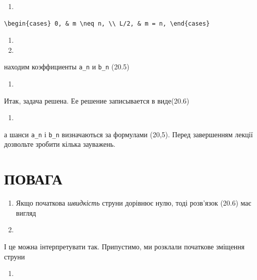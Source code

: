 \documentclass[
  ukrainian,
]{article}
\providecommand{\tightlist}{%
  \setlength{\itemsep}{0pt}\setlength{\parskip}{0pt}}
\begin{document}
\begin{enumerate}
\def\labelenumi{\arabic{enumi}.}
\setcounter{enumi}{8}
\tightlist
\item
\end{enumerate}

\begin{verbatim}
\begin{cases} 0, & m \neq n, \\ L/2, & m = n, \end{cases}
\end{verbatim}

\begin{enumerate}
\def\labelenumi{\arabic{enumi}.}
\setcounter{enumi}{9}
\tightlist
\item
\item
\end{enumerate}

находим коэффициенты \texttt{a\_n} и \texttt{b\_n} (20.5)

\begin{enumerate}
\def\labelenumi{\arabic{enumi}.}
\setcounter{enumi}{11}
\tightlist
\item
\end{enumerate}

Итак, задача решена. Ее решение записывается в виде(20.6)

\begin{enumerate}
\def\labelenumi{\arabic{enumi}.}
\setcounter{enumi}{12}
\tightlist
\item
\end{enumerate}

а шанси \texttt{a\_n} і \texttt{b\_n} визначаються за формулами (20,5).
Перед завершенням лекції дозвольте зробити кілька зауважень.

\section{ПОВАГА}\label{ux43fux43eux432ux430ux433ux430}

\begin{enumerate}
\def\labelenumi{\arabic{enumi}.}
\item
  Якщо початкова \emph{швидкість} струни дорівнює нулю, тоді розв'язок
  (20.6) має вигляд
\item
\end{enumerate}

І це можна інтерпретувати так. Припустимо, ми розклали початкове
зміщення струни

\begin{enumerate}
\def\labelenumi{\arabic{enumi}.}
\setcounter{enumi}{14}
\tightlist
\item
\end{enumerate}
\end{document}
